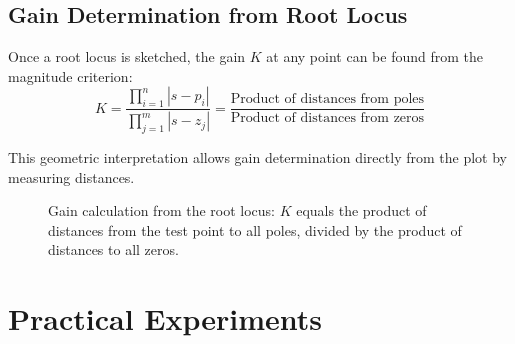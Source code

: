 \subsection{Gain Determination from Root Locus}

Once a root locus is sketched, the gain $K$ at any point can be found from the magnitude criterion:
\begin{equation}
K = \frac{\prod_{i=1}^{n} |s - p_i|}{\prod_{j=1}^{m} |s - z_j|} = \frac{\text{Product of distances from poles}}{\text{Product of distances from zeros}}
\label{eq:gain_formula}
\end{equation}

This geometric interpretation allows gain determination directly from the plot by measuring distances.

\begin{figure}[H]
\centering
{}
\caption{Gain calculation from the root locus: $K$ equals the product of distances from the test point to all poles, divided by the product of distances to all zeros.}
\label{fig:gain_calculation}
\end{figure}

\section{Practical Experiments}
\label{sec:experiments}

